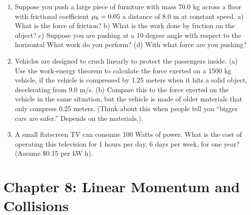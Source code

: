 \documentclass[10pt]{article}
\begin{document}
\begin{enumerate}
\item Suppose you push a large piece of furniture with mass 70.0 kg across a floor with frictional coefficient $\mu_{\rm k} = 0.05$ a distance of 8.0 m at constant speed.  a) What is the force of friction?  b) What is the work done by friction on the object?  c) Suppose you are pushing at a 10 degree angle with respect to the horizontal What work do you perform? (d) With what force are you pushing? \\ \vspace{3cm}
\item  Vehicles are designed to cruch linearly to protect the passengers inside. (a) Use the work-energy theorem to calculate the force exerted on a 1500 kg vehicle, if the vehicle is compressed by 1.25 meters when it hits a solid object, decelerating from 9.0 m/s. (b) Compare this to the force exerted on the vehicle in the same situation, but the vehicle is made of older materials that only compress 0.25 meters. (Think about this when people tell you ``bigger cars are safer.''  Depends on the materials.).  \\ \vspace{3cm}
\item A small flatscreen TV can consume 100 Watts of power.  What is the cost of operating this television for 1 hours per day, 6 days per week, for one year?  (Assume \$0.15 per kW h). \\ \vspace{2cm}
\end{enumerate}

\section{Chapter 8: Linear Momentum and Collisions}
\end{document}
